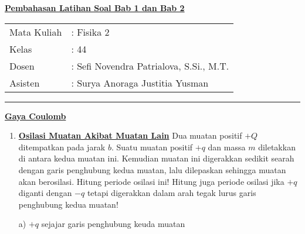 \pagebreak
\begin{center}
    \underline{\large \textbf{Pembahasan Latihan Soal Bab 1 dan Bab 2}}
\end{center}
\begin{tabular}{l l}
    Mata Kuliah & : Fisika 2 \\
    Kelas & : 44 \\
    Dosen & : Sefi Novendra Patrialova, S.Si., M.T. \\
    Asisten & : Surya Anoraga Justitia Yusman
\end{tabular}
\vskip10pt
\hrule
\vskip10pt
\noindent\underline{\textbf{Gaya Coulomb}}
\begin{enumerate}
    \item \underline{\textbf{Osilasi Muatan Akibat Muatan Lain}}
    \vskip5pt
    Dua muatan positif $+Q$ ditempatkan pada jarak $b$. Suatu muatan positif $+q$ dan massa $m$ diletakkan di antara kedua muatan ini. Kemudian muatan ini digerakkan sedikit searah dengan garis penghubung kedua muatan, lalu dilepaskan sehingga muatan akan berosilasi. Hitung periode osilasi ini! Hitung juga periode osilasi jika $+q$ diganti dengan $-q$ tetapi digerakkan dalam arah tegak lurus garis penghubung kedua muatan!
    
    a) $+q$ sejajar garis penghubung keuda muatan
    \begin{center}
    \end{center}


\end{enumerate}
